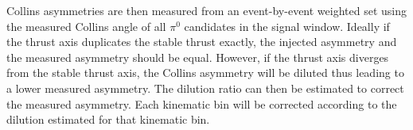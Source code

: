 Collins asymmetries are then measured from an event-by-event weighted set using the measured Collins angle of all $\pi^0$ candidates in the signal window. Ideally if the thrust axis duplicates the stable thrust exactly, the injected asymmetry and the measured asymmetry should be equal. However, if the thrust axis diverges from the stable thrust axis, the Collins asymmetry will be diluted thus leading to a lower measured asymmetry. The dilution ratio can then  be estimated to correct the measured asymmetry. Each kinematic bin will be corrected according to  the dilution estimated for that kinematic bin.

\begin{figure}[H]
  \centering     

\end{figure}
